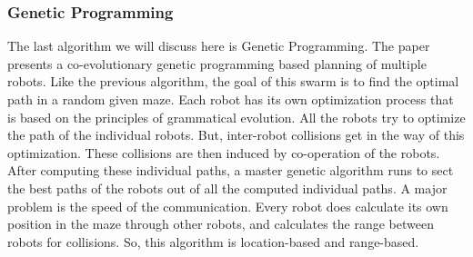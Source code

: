 
\subsubsection{Genetic Programming}
The last algorithm we will discuss here is Genetic Programming. \cite{kala2012multi}
The paper presents a co-evolutionary genetic programming based planning of multiple robots. 
Like the previous algorithm, the goal of this swarm is to find the optimal path in a random given maze.
Each robot has its own optimization process that is based on the principles of grammatical evolution. 
All the robots try to optimize the path of the individual robots. 
But, inter-robot collisions get in the way of this optimization. 
These collisions are then induced by co-operation of the robots. 
After computing these individual paths, a master genetic algorithm runs to sect the best paths of the robots out of all the computed individual paths. 
A major problem is the speed of the communication.
Every robot does calculate its own position in the maze through other robots, and calculates the range between robots for collisions.
So, this algorithm is location-based and range-based.



